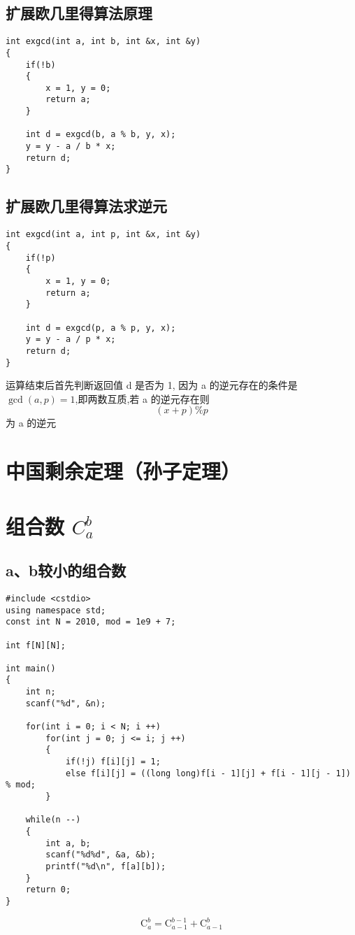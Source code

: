 \documentclass[]{book}
\begin{document}
\section{扩展欧几里得算法原理}
\begin{lstlisting}
int exgcd(int a, int b, int &x, int &y)
{
    if(!b)
    {
        x = 1, y = 0;
        return a;
    }
    
    int d = exgcd(b, a % b, y, x);
    y = y - a / b * x;
    return d;
}
\end{lstlisting}
\section{扩展欧几里得算法求逆元}
\begin{lstlisting}
int exgcd(int a, int p, int &x, int &y)
{
    if(!p)
    {
        x = 1, y = 0;
        return a;
    }
    
    int d = exgcd(p, a % p, y, x);
    y = y - a / p * x;
    return d;
}
\end{lstlisting}
运算结束后首先判断返回值 d 是否为 1, 因为 a 的逆元存在的条件是 $\gcd(a, p) = 1$,即两数互质,若 a 的逆元存在则
\[(x + p) \% p\]
为 a 的逆元
\chapter{中国剩余定理（孙子定理）}

\chapter{组合数 $C_a^b$}
\section{a、b较小的组合数}
\begin{lstlisting}
#include <cstdio>
using namespace std;
const int N = 2010, mod = 1e9 + 7;

int f[N][N];

int main()
{
    int n;
    scanf("%d", &n);
    
    for(int i = 0; i < N; i ++)
        for(int j = 0; j <= i; j ++)
        {
            if(!j) f[i][j] = 1;
            else f[i][j] = ((long long)f[i - 1][j] + f[i - 1][j - 1]) % mod;
        }
    
    while(n --)
    {
        int a, b;
        scanf("%d%d", &a, &b);
        printf("%d\n", f[a][b]);
    }
    return 0;
}
\end{lstlisting}
\[ \mathrm{C}_a^b = \mathrm{C}_{a-1}^{b-1} + \mathrm{C}_{a-1}^b\]
\end{document}
